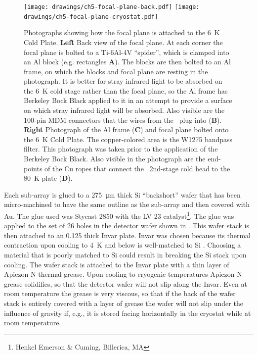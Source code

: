 \begin{figure}
\centering
\texttt{[image: drawings/ch5-focal-plane-back.pdf]}
\texttt{[image: drawings/ch5-focal-plane-cryostat.pdf]}
\caption[Photograph of focal plane in cryostat]{
  Photographs showing how the focal plane is attached to the \SI{6}{\K} Cold Plate.
  \textbf{Left}
  Back view of the focal plane.
  At each corner the focal plane is bolted to a Ti-6Al-4V ``spider'', which is clamped into an Al block (e.g. rectangles \textbf{A}).
  The blocks are then bolted to an Al frame, on which the blocks and focal plane are resting in the photograph.
  It is better for stray infrared light to be absorbed on the \SI{6}{\K} cold stage rather than the focal plane, so the Al frame has Berkeley Bock Black \cite{persky_review_1999} applied to it in an attempt to provide a surface on which stray infrared light will be absorbed.
  Also visible are the 100-pin MDM connectors that the wires from the \MCE\ plug into (\textbf{B}).
  \textbf{Right}
  Photograph of the Al frame (\textbf{C}) and focal plane bolted onto the \SI{6}{\K} Cold Plate.
  The copper-colored area is the W1275 bandpass filter.
  This photograph was taken prior to the application of the Berkeley Bock Black.
  Also visible in the photograph are the end-points of the Cu ropes that connect the \PTC\ 2nd-stage cold head to the \SI{80}{\K} plate (\textbf{D}).
}
\label{fig:ch5-focal-plane-back}
\end{figure}

Each sub-array is glued to a \SI{275}{\um} thick Si ``backshort'' wafer that has been micro-machined to have the same outline as the sub-array and then covered with Au.
The glue used was Stycast 2850 with the LV 23 catalyst\footnote{Henkel Emerson \& Cuming, Billerica, MA}.
The glue was applied to the set of 26 holes in the detector wafer shown in .
This wafer stack is then attached to an \SI{0.125}{\in} thick Invar plate.
Invar was chosen because its thermal contraction upon cooling to \SI{4}{\K} and below is well-matched to Si \cite{ekin_experimental_2006}.
Choosing a material that is poorly matched to Si could result in breaking the Si stack upon cooling.
The wafer stack is attached to the Invar plate with a thin layer of Apiezon-N thermal grease.
Upon cooling to cryogenic temperatures Apiezon N grease solidifies, so that the detector wafer will not slip along the Invar.
Even at room temperature the grease is very viscous, so that if the back of the wafer stack is entirely covered with a layer of grease the wafer will not slip under the influence of gravity if, e.g., it is stored facing horizontally in the cryostat while at room temperature.


